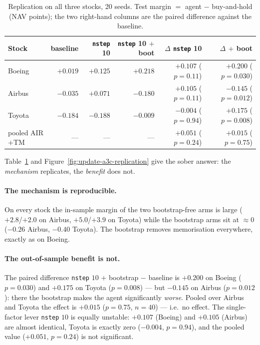 \begin{table}[H]
  \centering
  \caption{Replication on all three stocks, 20 seeds. Test margin $=$ agent $-$ buy-and-hold
           (NAV points); the two right-hand columns are the paired difference against the
           baseline.}
  \label{tab:update-a3c-replication}
  \small
  \begin{tabular}{lrrrrr}
    \toprule
    Stock & baseline & \texttt{nstep} 10 & \texttt{nstep} 10 $+$ boot & $\Delta$ \texttt{nstep} 10 & $\Delta$ $+$ boot\\
    \midrule
    Boeing & $+0.019$ & $+0.125$ & $+0.218$ & $+0.107$ ($p=0.11$)  & $+0.200$ ($p=0.030$)\\
    Airbus & $-0.035$ & $+0.071$ & $-0.180$ & $+0.105$ ($p=0.11$)  & $-0.145$ ($p=0.012$)\\
    Toyota & $-0.184$ & $-0.188$ & $-0.009$ & $-0.004$ ($p=0.94$)  & $+0.175$ ($p=0.008$)\\
    \midrule
    pooled AIR$+$TM & --- & --- & --- & $+0.051$ ($p=0.24$) & $+0.015$ ($p=0.75$)\\
    \bottomrule
  \end{tabular}
\end{table}

Table~\ref{tab:update-a3c-replication} and Figure~\ref{fig:update-a3c-replication} give the
sober answer: the \emph{mechanism} replicates, the \emph{benefit} does not.

\paragraph{The mechanism is reproducible.} On every stock the in-sample margin of the two
bootstrap-free arms is large ($+2.8$/$+2.0$ on Airbus, $+5.0$/$+3.9$ on Toyota) while the
bootstrap arms sit at $\approx 0$ ($-0.26$ Airbus, $-0.40$ Toyota). The bootstrap removes
memorisation everywhere, exactly as on Boeing.

\paragraph{The out-of-sample benefit is not.} The paired difference \texttt{nstep} $10$ $+$
bootstrap $-$ baseline is $+0.200$ on Boeing ($p=0.030$) and $+0.175$ on Toyota
($p=0.008$) --- but $\mathbf{-0.145}$ on Airbus ($p=0.012$): there the bootstrap makes the
agent significantly \emph{worse}. Pooled over Airbus and Toyota the effect is $+0.015$
($p=0.75$, $n=40$) --- i.e.\ no effect. The single-factor lever \texttt{nstep} $10$ is
equally unstable: $+0.107$ (Boeing) and $+0.105$ (Airbus) are almost identical, Toyota is
exactly zero ($-0.004$, $p=0.94$), and the pooled value ($+0.051$, $p=0.24$) is not
significant.

